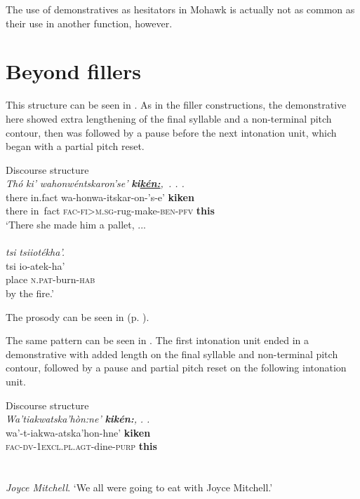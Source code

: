\documentclass[output=paper]{langscibook}
\begin{document}
The use of demonstratives as hesitators in Mohawk is actually not as common as their use in another function, however.

\section{Beyond fillers}
\label{sec:mithun:6}

This structure can be seen in . As in the filler constructions, the demonstrative here showed extra lengthening of the final syllable and a non-terminal pitch contour, then was followed by a pause before the next intonation unit, which began with a partial pitch reset.

\ea%
    \label{ex:mithun:17}
    Discourse structure\\
    \glll \textit{Thó}    \textit{ki’}      \textit{wahonwéntskaron’se’} \textbf{\textit{ki\uline{kén:}}}\textit{,}~\textit{. . .}\\
    there  in.fact    wa-honwa-itskar-on-’s-e’          \textbf{kiken}\\
    there  {in~fact}    \textsc{fac-fi>m.sg}{}-rug-make-\textsc{ben-pfv} \textbf{this}\\
    \glt ‘There she made him a pallet,  ...\\~\\

   \glll \textit{tsi}    \textit{tsiiotékha’.}\\
    tsi    io-atek-ha’\\
    place  \textsc{n.pat}{}-burn-\textsc{hab}\\
   \glt by the fire.’\\
\z

The prosody can be seen in  (p. \pageref{fig:mithun:9}).

The same pattern can be seen in . The first intonation unit ended in a demonstrative with added length on the final syllable and non-terminal pitch contour, followed by a pause and partial pitch reset on the following intonation unit.

\ea%
    \label{ex:mithun:18}
    Discourse structure\\
    \glll \textit{Wa’tiakwatska’hòn:ne’} \textbf{\textit{kikén:}}\textit{,}    \textit{. .}\\
    wa’-t-iakwa-atska’hon-hne’        \textbf{kiken}\\
    \textsc{fac-dv-1excl.pl.agt}{}-dine-\textsc{purp}    \textbf{this}\\~\\~\\
    \textit{Joyce Mitchell}.
    \glt ‘We all were going to eat with Joyce Mitchell.’\\
\z
\end{document}
